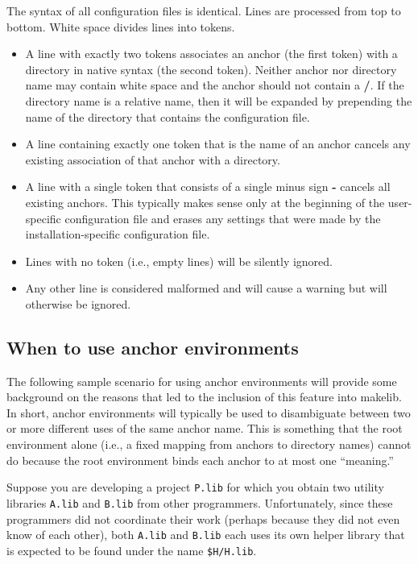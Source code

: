 The syntax of all configuration files is identical.  Lines are
processed from top to bottom. White space divides lines into tokens.
\begin{itemize}
\item A line with exactly two tokens associates an anchor (the first
token) with a directory in native syntax (the second token).  Neither
anchor nor directory name may contain white space and the anchor
should not contain a {\bf /}.  If the directory name is a relative
name, then it will be expanded by prepending the name of the directory
that contains the configuration file.
\item A line containing exactly one token that is the name of an
anchor cancels any existing association of that anchor with a
directory.
\item A line with a single token that consists of a single minus sign
{\bf -} cancels all existing anchors.  This typically makes sense only
at the beginning of the user-specific configuration file and
erases any settings that were made by the installation-specific
configuration file.
\item Lines with no token (i.e., empty lines) will be silently ignored.
\item Any other line is considered malformed and will cause a warning
but will otherwise be ignored.
\end{itemize}

\subsection{When to use anchor environments}

The following sample scenario for using anchor environments will
provide some background on the reasons that led to the inclusion of
this feature into makelib.  In short, anchor environments will typically be
used to disambiguate between two or more different uses of the same
anchor name.  This is something that the root environment alone (i.e.,
a fixed mapping from anchors to directory names) cannot do because the
root environment binds each anchor to at most one ``meaning.''

Suppose you are developing a project {\tt P.lib} for which you obtain
two utility libraries {\tt A.lib} and {\tt B.lib} from other
programmers.  Unfortunately, since these programmers did not
coordinate their work (perhaps because they did not even know of each
other), both {\tt A.lib} and {\tt B.lib} each uses its own helper
library that is expected to be found under the name {\tt \$H/H.lib}.

